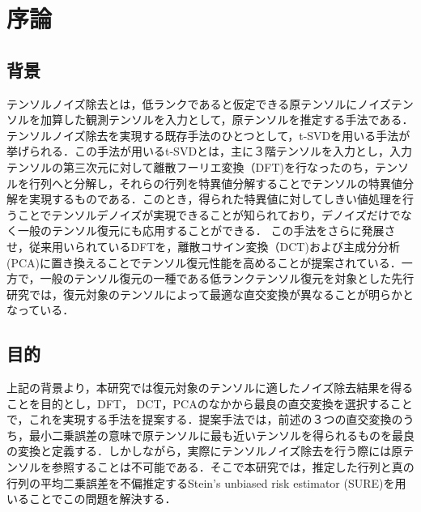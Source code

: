 \chapter{序論}
\section{背景}
テンソルノイズ除去とは，低ランクであると仮定できる原テンソルにノイズテンソルを加算した観測テンソルを入力として，原テンソルを推定する手法である．テンソルノイズ除去を実現する既存手法のひとつとして，t-SVD\cite{Kilmer}を用いる手法が挙げられる．この手法が用いるt-SVDとは，主に３階テンソルを入力とし，入力テンソルの第三次元に対して離散フーリエ変換（DFT)を行なったのち，テンソルを行列へと分解し，それらの行列を特異値分解することでテンソルの特異値分解を実現するものである．このとき，得られた特異値に対してしきい値処理を行うことでテンソルデノイズが実現できることが知られており，デノイズだけでなく一般のテンソル復元にも応用することができる\cite{Lu}．
この手法をさらに発展させ，従来用いられているDFTを，離散コサイン変換（DCT)および主成分分析(PCA)に置き換えることでテンソル復元性能を高めることが提案されている\cite{DCT, kohama}．一方で，一般のテンソル復元の一種である低ランクテンソル復元を対象とした先行研究\cite{kohama}では，復元対象のテンソルによって最適な直交変換が異なることが明らかとなっている．
\section{目的}
上記の背景より，本研究では復元対象のテンソルに適したノイズ除去結果を得ることを目的とし，DFT， DCT，PCAのなかから最良の直交変換を選択することで，これを実現する手法を提案する．提案手法では，前述の３つの直交変換のうち，最小二乗誤差の意味で原テンソルに最も近いテンソルを得られるものを最良の変換と定義する．しかしながら，実際にテンソルノイズ除去を行う際には原テンソルを参照することは不可能である．そこで本研究では，推定した行列と真の行列の平均二乗誤差を不偏推定するStein's unbiased risk estimator (SURE)を用いることでこの問題を解決する．